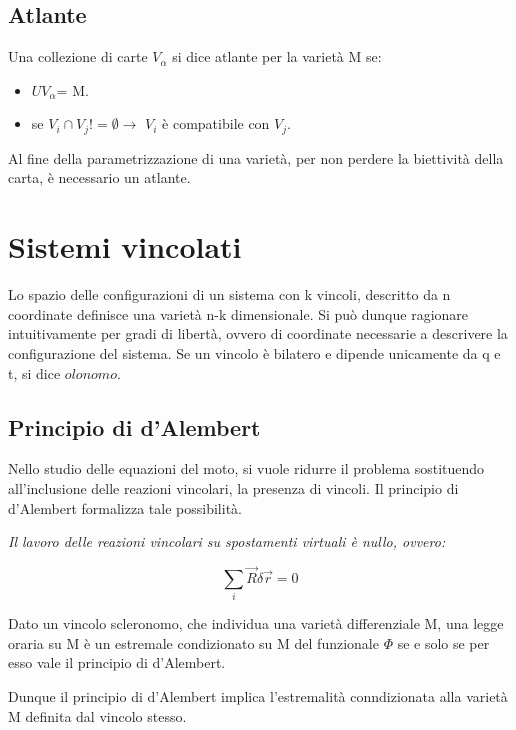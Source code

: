 \documentclass{article}
\begin{document}
            \subsection{Atlante}
            Una collezione di carte $V_\alpha$ si dice atlante per la varietà M se:
            \begin{itemize}
                \item $U V_\alpha$= M.
                \item se $V_i \cap V_j != \emptyset \rightarrow$ $V_i$ è compatibile con $V_j$.
            \end{itemize}
            Al fine della parametrizzazione di una varietà, per non perdere la biettività della carta, è necessario un atlante.

            \section{Sistemi vincolati}
            Lo spazio delle configurazioni di un sistema con k vincoli, descritto da n coordinate definisce una varietà n-k dimensionale. Si può dunque ragionare intuitivamente per gradi di libertà, ovvero di coordinate necessarie a descrivere la configurazione del sistema.
            Se un vincolo è bilatero e dipende unicamente da q e t, si dice $olonomo$.

            \subsection{Principio di d'Alembert}
            Nello studio delle equazioni del moto, si vuole ridurre il problema sostituendo all'inclusione delle reazioni vincolari, la presenza di vincoli. Il principio di d'Alembert formalizza tale possibilità.

            \textit{Il lavoro delle reazioni vincolari su spostamenti virtuali è nullo, ovvero:}

            \begin{equation}
                \sum_i \vec{R} \delta \vec{r}=0
            \end{equation}


            Dato un vincolo scleronomo, che individua una varietà differenziale M, una legge oraria su M è un estremale condizionato su M del funzionale $\Phi$ se e solo se per esso vale il principio di d'Alembert.



            Dunque il principio di d'Alembert implica l'estremalità conndizionata alla varietà M definita dal vincolo stesso.
\end{document}
